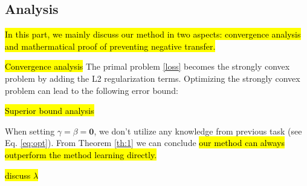 \subsection{Analysis}\label{subsec:analysis}
\hl{In this part, we mainly discuss our method in two aspects: convergence analysis and mathermatical proof of preventing negative transfer.} 

\hl{Convergence analysis}
The primal problem \eqref{loss} becomes the strongly convex problem by adding the L2 regularization terms. Optimizing the strongly convex problem can lead to the following error bound:


\hl{Superior bound analysis}


When setting $\gamma=\beta = \mathbf{0}$, we don't utilize any knowledge from previous task (see Eq. \eqref{eq:opt}). From Theorem \ref{th:1} we can conclude \hl{our method can always outperform the method learning directly.}

\hl{discuss $\lambda$}